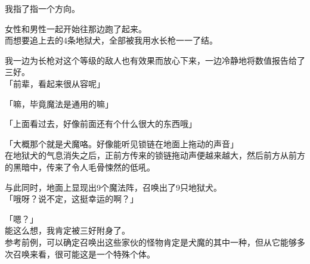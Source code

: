 我指了指一个方向。

女性和男性一起开始往那边跑了起来。\\

而想要追上去的4条地狱犬，全部被我用水长枪一一了结。

我一边为长枪对这个等级的敌人也有效果而放心下来，一边冷静地将数值报告给了三好。\\

「前辈，看起来很从容呢」

「嘛，毕竟魔法是通用的嘛」

「上面看过去，好像前面还有个什么很大的东西哦」

「大概那个就是犬魔咯。好像能听见锁链在地面上拖动的声音」\\

在地狱犬的气息消失之后，正前方传来的锁链拖动声便越来越大，然后前方从前方的黑暗中，传来了令人毛骨悚然的低吼。

与此同时，地面上显现出9个魔法阵，召唤出了9只地狱犬。\\

「哦呀？说不定，这挺幸运的啊？」

「嗯？」\\

能这么想，我肯定被三好附身了。\\

参考前例，可以确定召唤出这些家伙的怪物肯定是犬魔的其中一种，但从它能够多次召唤来看，很可能这是一个特殊个体。

